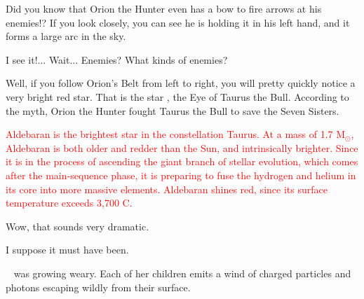 \documentclass[main.tex]{subfiles}
\begin{document}
\par \Pleione Did you know that Orion the Hunter even has a bow to fire arrows at his enemies!?  If you look closely, you can see he is holding it in his left hand, and it forms a large arc in the sky.

\par \Maia I see it!... Wait... Enemies?  What kinds of enemies?

\par \Pleione Well, if you follow Orion's Belt from left to right, you will pretty quickly notice a very bright red star.  That is the star \rmaldebarran, the Eye of Taurus the Bull.  According to the myth, Orion the Hunter fought Taurus the Bull to save the Seven Sisters.  

\begin{tcolorbox}[sharp corners, colback=red!30, colframe=red!80!blue, title=Aldebaran]
\par \textcolor{red} {Aldebaran is the brightest star in the constellation Taurus.  At a mass of 1.7 M$_{\odot}$, Aldebaran is both older and redder than the Sun, and intrinsically brighter.  Since it is in the process of ascending the giant branch of stellar evolution, which comes after the main-sequence phase, it is preparing to fuse the hydrogen and helium in its core into more massive elements.  Aldebaran shines red, since its surface temperature exceeds 3,700 C.}
\end{tcolorbox}

\par \Maia Wow, that sounds very dramatic.

\par \Pleione I suppose it must have been.

\par \nar \rmpleione~ was growing weary.  Each of her children emits a wind of charged particles and photons escaping wildly from their surface.
\end{document}
